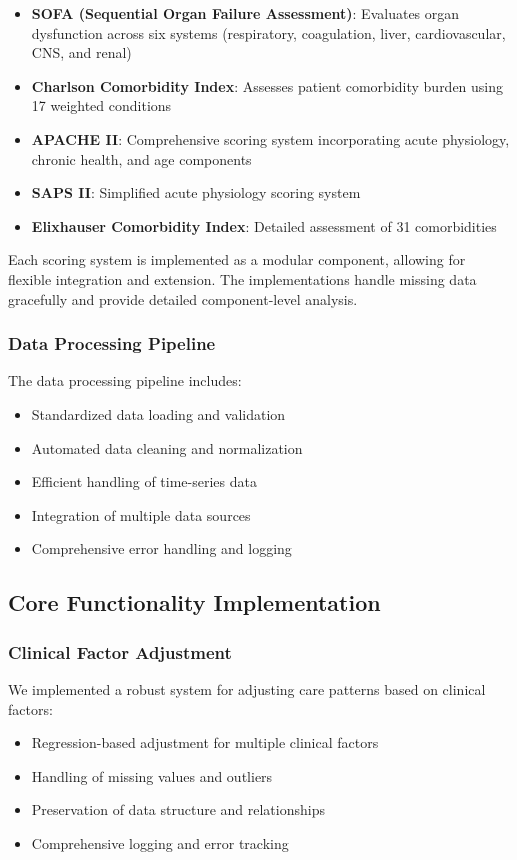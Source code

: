 \documentclass[12pt]{article}
\begin{document}
\begin{itemize}
    \item \textbf{SOFA (Sequential Organ Failure Assessment)}: Evaluates organ dysfunction across six systems (respiratory, coagulation, liver, cardiovascular, CNS, and renal)
    \item \textbf{Charlson Comorbidity Index}: Assesses patient comorbidity burden using 17 weighted conditions
    \item \textbf{APACHE II}: Comprehensive scoring system incorporating acute physiology, chronic health, and age components
    \item \textbf{SAPS II}: Simplified acute physiology scoring system
    \item \textbf{Elixhauser Comorbidity Index}: Detailed assessment of 31 comorbidities
\end{itemize}

Each scoring system is implemented as a modular component, allowing for flexible integration and extension. The implementations handle missing data gracefully and provide detailed component-level analysis.

\subsubsection{Data Processing Pipeline}

The data processing pipeline includes:
\begin{itemize}
    \item Standardized data loading and validation
    \item Automated data cleaning and normalization
    \item Efficient handling of time-series data
    \item Integration of multiple data sources
    \item Comprehensive error handling and logging
\end{itemize}

\subsection{Core Functionality Implementation}

\subsubsection{Clinical Factor Adjustment}

We implemented a robust system for adjusting care patterns based on clinical factors:
\begin{itemize}
    \item Regression-based adjustment for multiple clinical factors
    \item Handling of missing values and outliers
    \item Preservation of data structure and relationships
    \item Comprehensive logging and error tracking
\end{itemize}
\end{document}
